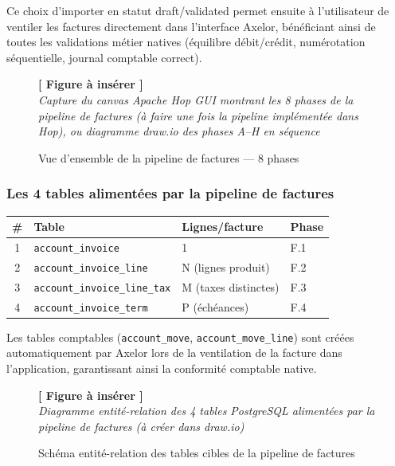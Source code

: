 \documentclass[a4paper,12pt]{article}
\newcommand{\insertfig}[3][0.80]{%
  \begin{figure}[H]
  \centering
  \colorbox{placeholderbg}{\parbox{#1\textwidth}{%
    \vspace{1.6cm}
    \centering
    {\large\color{placeholderborder}\textbf{[ Figure à insérer ]}}\\[0.5cm]
    {\small\color{gray}\textit{#2}}%
    \vspace{1.6cm}
  }}
  \caption{#3}
  \end{figure}
}
\begin{document}
\medskip
Ce choix d'importer en statut draft/validated permet ensuite à l'utilisateur de ventiler les factures directement dans l'interface Axelor, bénéficiant ainsi de toutes les validations métier natives (équilibre débit/crédit, numérotation séquentielle, journal comptable correct).

\insertfig{Capture du canvas Apache Hop GUI montrant les 8 phases de la pipeline de factures (à faire une fois la pipeline implémentée dans Hop), ou diagramme draw.io des phases A--H en séquence}{Vue d'ensemble de la pipeline de factures — 8 phases}

\subsubsection{Les 4 tables alimentées par la pipeline de factures}

\begin{center}
\begin{tabular}{|c|l|l|l|}
\hline
\textbf{\#} & \textbf{Table} & \textbf{Lignes/facture} & \textbf{Phase} \\
\hline
1 & \texttt{account\_invoice} & 1 & F.1 \\
\hline
2 & \texttt{account\_invoice\_line} & N (lignes produit) & F.2 \\
\hline
3 & \texttt{account\_invoice\_line\_tax} & M (taxes distinctes) & F.3 \\
\hline
4 & \texttt{account\_invoice\_term} & P (échéances) & F.4 \\
\hline
\end{tabular}
\end{center}

Les tables comptables (\texttt{account\_move}, \texttt{account\_move\_line}) sont créées automatiquement par Axelor lors de la ventilation de la facture dans l'application, garantissant ainsi la conformité comptable native.

\insertfig{Diagramme entité-relation des 4 tables PostgreSQL alimentées par la pipeline de factures (à créer dans draw.io)}{Schéma entité-relation des tables cibles de la pipeline de factures}
\end{document}
